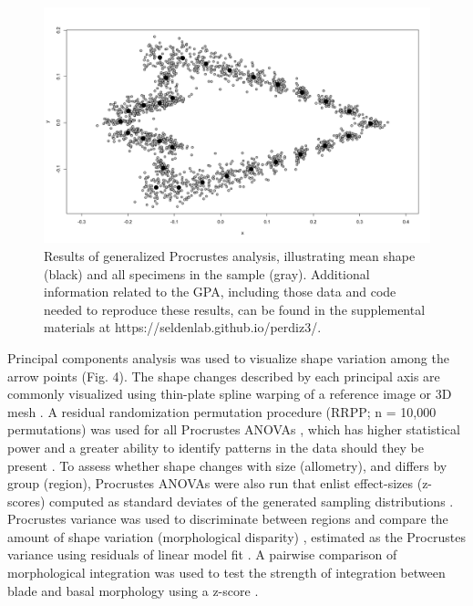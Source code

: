 \documentclass[smallextended]{svjour3}       %
\begin{document}
\begin{figure}
\includegraphics[width=1\linewidth]{ms-figs/figure3} \caption{Results of generalized Procrustes analysis, illustrating mean shape (black) and all specimens in the sample (gray). Additional information related to the GPA, including those data and code needed to reproduce these results, can be found in the supplemental materials at https://seldenlab.github.io/perdiz3/.}\label{fig:fig3}
\end{figure}

Principal components analysis \cite{RN8576} was used to visualize shape
variation among the arrow points (Fig. 4). The shape changes described
by each principal axis are commonly visualized using thin-plate spline
warping of a reference image or 3D mesh \cite{RN8555,RN8553}. A residual
randomization permutation procedure (RRPP; n = 10,000 permutations) was
used for all Procrustes ANOVAs \cite{RN8579,RN8334}, which has higher
statistical power and a greater ability to identify patterns in the data
should they be present \cite{RN6995}. To assess whether shape changes
with size (allometry), and differs by group (region), Procrustes ANOVAs
\cite{RN7046} were also run that enlist effect-sizes (z-scores) computed
as standard deviates of the generated sampling distributions
\cite{RN8477}. Procrustes variance was used to discriminate between
regions and compare the amount of shape variation (morphological
disparity) \cite{RN5703}, estimated as the Procrustes variance using
residuals of linear model fit \cite{RN8314}. A pairwise comparison of
morphological integration was used to test the strength of integration
between blade and basal morphology using a z-score \cite{RN8340}.
\end{document}
